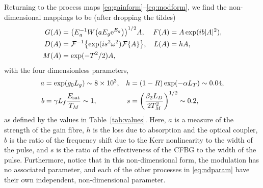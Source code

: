 \documentclass[9pt,twocolumn,twoside]{osajnl}
\let\originalleft\left
\let\originalright\right
\renewcommand{\left}{\mathopen{}\mathclose\bgroup\originalleft}
\renewcommand{\right}{\aftergroup\egroup\originalright}
\newcommand{\Es}{E_{\textrm{sat}}} %
\newcommand{\FT}[1]{\mathcal{F}\left\{ #1 \right\}} %
\newcommand{\FTi}[1]{\mathcal{F}^{-1}\left\{ #1 \right\}} %
\begin{document}
Returning to the process maps \eqref{eq:gainform}--\eqref{eq:modform}, we find the non-dimensional mappings to be (after dropping the tildes)
\begin{align}
	G(A) &= \left(E_g^{-1} W \left( a E_g \textrm{e}^{E_g}\right) \right)^{1/2} A, & F(A) &= A \exp( i b |A|^2), \nonumber \\
	D(A) &= \FTi{\exp( i s^2 \omega^2 ) \FT{A}}, & L(A) &= h A, \label{eq:effects} \\
	M(A) &= \exp( -T^2 / 2 ) A, \nonumber
\end{align}
with the four dimensionless parameters,
\begin{equation}
	\begin{aligned}
		a &= \exp( g_0 L_g ) \sim 8 \times 10^3, & 
		h &= (1 - R) \exp( - \alpha L_T) \sim 0.04, \\
		b &= \gamma L_f \frac{\Es}{T_M} \sim 1, & s &= \left( \frac{\beta_2 L_D}{2 T_M^2} \right)^{1/2} \sim 0.2,
		\label{eq:ndparam}
	\end{aligned}
\end{equation}
as defined by the values in Table~\ref{tab:values}. Here, $a$ is a measure of the strength of the gain fibre, $h$ is the loss due to absorption and the optical coupler, $b$ is the ratio of the frequency shift due to the Kerr nonlinearity to the width of the pulse, and $s$ is the ratio of the effectiveness of the CFBG to the width of the pulse. Furthermore, notice that in this non-dimensional form, the modulation has no associated parameter, and each of the other processes in \eqref{eq:ndparam} have their own independent, non-dimensional parameter.
\end{document}

